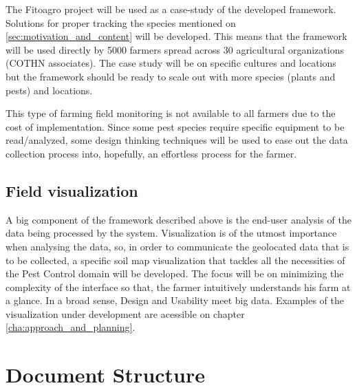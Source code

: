 The Fitoagro project will be used as a case-study of the developed framework. Solutions for proper tracking the species mentioned on \ref{sec:motivation_and_content} will be developed. This means that the framework will be used directly by 5000 farmers spread across 30 agricultural organizations (COTHN associates). The case study will be on specific cultures and locations but the framework should be ready to scale out with more species (plants and pests) and locations.

This type of farming field monitoring is not available to all farmers due to the cost of implementation. Since some pest species require specific equipment to be read/analyzed, some design thinking techniques will be used to ease out the data collection process into, hopefully, an effortless process for the farmer. 

\subsection{Field visualization}
\label{sec:field_visualization}

A big component of the framework described above is the end-user analysis of the data being processed by the system. Visualization is of the utmost importance when analysing the data, so, in order to communicate the geolocated data that is to be collected, a specific soil map visualization that tackles all the necessities of the Pest Control domain will be developed. The focus will be on minimizing the complexity of the interface so that, the farmer intuitively understands his farm at a glance. In a broad sense, Design and Usability meet big data. Examples of the visualization under development are acessible on chapter \ref{cha:approach_and_planning}.

\section{Document Structure} %
\label{sec:document_structure}

